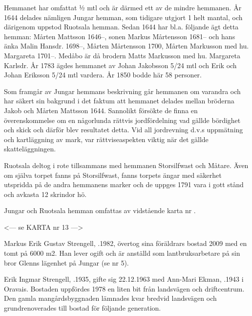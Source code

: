 Hemmanet har omfattat ½ mtl och är därmed ett av de mindre hemmanen. År 1644 delades nämligen Jungar hemman, som tidigare utgjort 1 helt mantal, och därigenom uppstod Ruotsala hemman. Sedan 1644 har bl.a. följande ägt detta hemman:
Mårten Mattsson 1646--, sonen Markus Mårtensson 1681-- och hans änka Malin Hansdr. 1698--, Mårten Mårtensson  1700, Mårten Markusson med hu. Margareta 1701--. Medåbo är då brodern Matts Markusson med hu. Margareta Karlsdr. År 1783 ägdes hemmanet av Johan Jakobsson 5/24 mtl och Erik och Johan Eriksson 5/24 mtl vardera. År 1850 bodde här 58 personer.

Som framgår av Jungar hemmans beskrivning går hemmanen om varandra och har säkert sin bakgrund i det faktum att hemmanet delades mellan bröderna Jakob och Mårten Mattsson 1644. Sannolikt försökte de finna en överenskommelse om en någorlunda rättvis jordfördelning vad gällde bördighet och skick och därför blev resultatet detta. Vid all jordrevning d.v.s uppmätning och kartläggning av mark, var rättviseaspekten viktig när det gällde skatteläggningen.

Ruotsala deltog i rote tillsammans med hemmanen Storsilfwast och Måtare. Även om själva torpet fanns på Storsilfwast, fanns torpets ängar med säkerhet utspridda på de andra hemmanens marker och de uppges 1791 vara i gott stånd och avkasta 12 skrindor hö.


Jungar och Ruotsala hemman omfattas av vidstående karta nr .


<--- se KARTA nr 13 --->








Markus Erik Gustav Strengell, .1982, övertog sina föräldrars bostad 2009 med en tomt på 6000 m2. Han lever ogift och är anställd som lantbruksarbetare på sin bror Glenns lägenhet på Jungar (se nr 5).\jhvspace{}



Erik Ingmar Strengell, .1935, gifte sig 22.12.1963 med Ann-Mari Ekman, .1943 i Oravais. Bostaden uppfördes 1978 en liten bit från landsvägen och driftcentrum. Den gamla mangårdsbyggnaden lämnades kvar bredvid landsvägen och grundrenoverades till bostad för följande generation.\jhvspace{}



